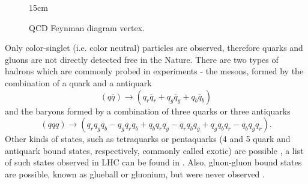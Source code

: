 \begin{figure}[!htm]{15cm} 
\caption{QCD Feynman diagram vertex.}%
\label{fig:QCDvertex}
\end{figure}

Only color-singlet (i.e. color neutral) particles are observed, therefore quarks and gluons are not directly detected free in the Nature. There are two types of hadrons which are commonly probed in experiments - the mesons, formed by the combination of a quark and a antiquark
\begin{equation}
    (q\overline q) \rightarrow (q_r \overline q_r + q_g \overline q_g + q_b \overline q_b)
\end{equation}
and the baryons formed by a combination of three quarks or three antiquarks
\begin{equation}
    (qqq) \rightarrow (q_r q_g q_b - q_g q_r q_b + q_b q_r q_g - q_r q_b q_g + q_g q_b q_r - q_b q_g q_r).
\end{equation}
Other kinds of states, such as tetraquarks or pentaquarks (4 and 5 quark and antiquark bound states, respectively, commonly called exotic) are possible \cite{Gell-Mann:1964ewy, Zweig:1964jf}, a list of such states observed in LHC can be found in \cite{LHCb-FIGURE-2021-001-report}. Also, gluon-gluon bound states are possible, known as glueball or gluonium, but were never observed \cite{Mathieu:2008me}. 

